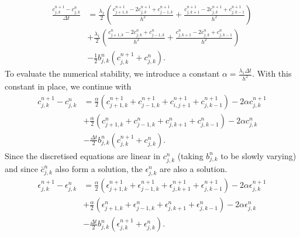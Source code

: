 \begin{equation*}
    \begin{split}
        \frac{c_{j,k}^{n+1} - c_{j,k}^{n}}{\Delta t} &=
        \frac{\lambda_1}{2}  \left( \frac{c_{j+1,k}^{n+1} - 2 c_{j,k}^{n+1} + c_{j-1,k}^{n+1} }{h^2} + 
                                    \frac{c_{j,k+1}^{n+1} - 2 c_{j,k}^{n+1} + c_{j,k-1}^{n+1} }{h^2} \right)  \\
                                   & +\frac{\lambda_1}{2} \left( \frac{c_{j+1,k}^{n} - 2 c_{j,k}^{n} + c_{j-1,k}^{n} }{h^2} + 
                                    \frac{c_{j,k+1}^{n} - 2 c_{j,k}^{n} + c_{j,k-1}^{n} }{h^2} \right) \\
                                   &-\frac{1}{2} b_{j,k}^{n} (c_{j,k}^{n+1} + c_{j,k}^{n}).
    \end{split}
\end{equation*}
To evaluate the numerical stability, we introduce a constant $\alpha = \frac{ \lambda_1 \Delta t }{h^2}$.
With this constant in place, we continue with
\begin{equation*}
    \begin{split}
        c_{j,k}^{n+1} - c_{j,k}^{n} &=
       \frac{\alpha}{2}  \left( c_{j+1,k}^{n+1} + c_{j-1,k}^{n+1} + 
                       c_{i,j+1}^{n+1} + c_{j,k-1}^{n+1}  \right) - 2 \alpha c_{j,k}^{n+1}  \\
                                   & +\frac{\alpha}{2} \left( c_{j+1,k}^{n}+ c_{j-1,k}^{n} + 
                                    c_{j,k+1}^{n} + c_{j,k-1}^{n}  \right) - 2 \alpha c_{j,k}^{n} \\
                                   &-\frac{\Delta t}{2} b_{j,k}^{n} (c_{j,k}^{n+1} + c_{j,k}^{n}).
    \end{split}
\end{equation*}
Since the discretised equations are linear in $c_{j,k}^{n}$ (taking $b_{j,k}^{n}$ to be slowly varying)
and since $\bar{c}_{j,k}^n$ also form a solution, the $\epsilon_{j,k}^n$ are also 
a solution.
\begin{equation*}
    \begin{split}
        \epsilon_{j,k}^{n+1} - \epsilon_{j,k}^{n} &=
       \frac{\alpha}{2}  \left( \epsilon_{j+1,k}^{n+1} + \epsilon_{j-1,k}^{n+1} + 
                                \epsilon_{j,k+1}^{n+1} + \epsilon_{j,k-1}^{n+1}  \right) - 2 \alpha \epsilon_{j,k}^{n+1}  \\
                                   & +\frac{\alpha}{2} \left( \epsilon_{j+1,k}^{n}+ \epsilon_{j-1,k}^{n} + 
                                   \epsilon_{j,k+1}^{n} + \epsilon_{j,k-1}^{n}  \right) - 2 \alpha \epsilon_{j,k}^{n} \\
                                   &-\frac{\Delta t}{2} b_{j,k}^{n} (\epsilon_{j,k}^{n+1} + \epsilon_{j,k}^{n}).
    \end{split}
\end{equation*}
